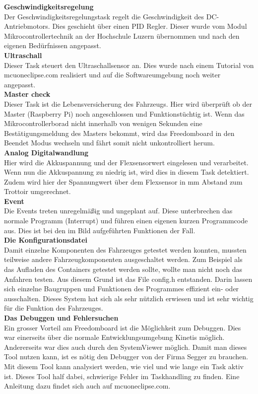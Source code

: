 \textbf{Geschwindigkeitsregelung}\\[0.2cm]
Der Geschwindigkeitsregelungstask regelt die Geschwindigkeit des DC-Antriebmotors. Dies geschieht über einen PID Regler. Dieser wurde vom Modul Mikrocontrollertechnik an der Hochschule Luzern übernommen und nach den eigenen Bedürfnissen angepasst.\\[0.2cm]
\textbf{Ultraschall}\\[0.2cm]
Dieser Task steuert den Ultraschallsensor an. Dies wurde nach einem Tutorial von mcuoneclipse.com realisiert und auf die Softwareumgebung noch weiter angepasst.\\[0.2cm]
\textbf{Master check}\\[0.2cm]
Dieser Task ist die Lebensversicherung des Fahrzeugs. Hier wird überprüft ob der Master (Raspberry Pi) noch angeschlossen und Funktionstüchtig ist. Wenn das Mikrocontrollerborad nicht innerhalb von wenigen Sekunden eine Bestätigungsmeldung des Masters bekommt, wird das Freedomboard in den Beendet Modus wechseln und fährt somit nicht unkontrolliert herum. \\[0.2cm]
\textbf{Analog Digitalwandlung}\\[0.2cm]
Hier wird die Akkuspannung und der Flexsensorwert eingelesen und verarbeitet. Wenn nun die Akkuspannung zu niedrig ist, wird dies in diesem Task detektiert. Zudem wird hier der Spannungwert über dem Flexsensor in mm Abstand zum Trottoir umgerechnet.\\[0.2cm]
\textbf{Event}\\[0.2cm]
Die Events treten unregelmäßig und ungeplant auf. Diese unterbrechen das normale Programm (Interrupt) und führen einen eigenen kurzen Programmcode aus. Dies ist bei den im Bild aufgeführten Funktionen der Fall.\\[0.2cm]
\textbf{Die Konfigurationsdatei}\\[0.2cm]
Damit einzelne Komponenten des Fahrzeuges getestet werden konnten, mussten teilweise andere Fahrzeugkomponenten ausgeschaltet werden. Zum Beispiel als das Aufladen des Containers getestet werden sollte, wollte man nicht noch das Anfahren testen. Aus diesem Grund ist das File config.h entstanden. Darin lassen sich einzelne Baugruppen und Funktionen des Programmes effizient ein- oder ausschalten. Dieses System hat sich als sehr nützlich erwiesen und ist sehr wichtig für die Funktion des Fahrzeuges.\\[0.2cm]
\textbf{Das Debuggen und Fehlersuchen}\\[0.2cm]
Ein grosser Vorteil am Freedomboard ist die Möglichkeit zum Debuggen. Dies war einerseits über die normale Entwicklungsumgebung Kinetis möglich. Andererseits war dies auch durch den SystemViewer möglich. Damit man dieses Tool nutzen kann, ist es nötig den Debugger von der Firma Segger zu brauchen. Mit diesem Tool kann analysiert werden, wie viel und wie lange ein Task aktiv ist. Dieses Tool half dabei, schwierige Fehler im Taskhandling zu finden. Eine Anleitung dazu findet sich auch auf mcuoneclipse.com.\\[0.2cm]

